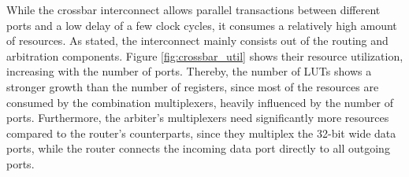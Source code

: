 While the crossbar interconnect allows parallel transactions between different
ports and a low delay of a few clock cycles, it consumes a relatively high
amount of resources. As stated, the interconnect mainly consists out of the
routing and arbitration components. Figure \ref{fig:crossbar_util} shows their
resource utilization, increasing with the number of ports. Thereby, the number
of \acp{LUT} shows a stronger growth than the number of registers, since most
of the resources are consumed by the combination multiplexers, heavily
influenced by the number of ports. Furthermore, the arbiter's multiplexers
need significantly more resources compared to the router's counterparts, since
they multiplex the 32-bit wide data ports, while the router connects the
incoming data port directly to all outgoing ports.



